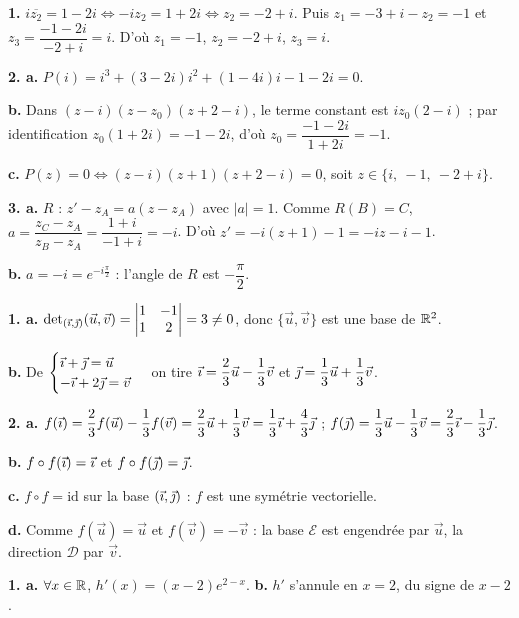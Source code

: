 \documentclass[11pt]{article}
\begin{document}

\textbf{1.} $i\overline{z_2} = 1 - 2i \Leftrightarrow -i z_2 = 1 + 2i \Leftrightarrow z_2 = -2 + i$. Puis $z_1 = -3 + i - z_2 = -1$ et $z_3 = \dfrac{-1 - 2i}{-2 + i} = i$. D'où $z_1 = -1$, $z_2 = -2 + i$, $z_3 = i$.

\textbf{2. a.} $P(i) = i^3 + (3 - 2i)i^2 + (1 - 4i)i - 1 - 2i = 0$.

\textbf{b.} Dans $(z - i)(z - z_0)(z + 2 - i)$, le terme constant est $i z_0(2 - i)$ ; par identification $z_0(1 + 2i) = -1 - 2i$, d'où $z_0 = \dfrac{-1 - 2i}{1 + 2i} = -1$.

\textbf{c.} $P(z) = 0 \Leftrightarrow (z - i)(z + 1)(z + 2 - i) = 0$, soit $z \in \{i,\ -1,\ -2 + i\}$.

\textbf{3. a.} $R$ : $z' - z_A = a(z - z_A)$ avec $|a| = 1$. Comme $R(B) = C$, $a = \dfrac{z_C - z_A}{z_B - z_A} = \dfrac{1 + i}{-1 + i} = -i$. D'où $z' = -i(z + 1) - 1 = -iz - i - 1$.

\textbf{b.} $a = -i = e^{-i\frac{\pi}{2}}$ : l'angle de $R$ est $-\dfrac{\pi}{2}$.

\textbf{1. a.} $\det_{(\vec{\imath},\vec{\jmath})}(\vec{u}, \vec{v}) = \begin{vmatrix} 1 & -1 \\ 1 & 2 \end{vmatrix} = 3 \ne 0$, donc $\{\vec{u}, \vec{v}\}$ est une base de $\mathbb{R}^2$.

\textbf{b.} De $\begin{cases} \vec{\imath} + \vec{\jmath} = \vec{u} \\ -\vec{\imath} + 2\vec{\jmath} = \vec{v} \end{cases}$ on tire $\vec{\imath} = \dfrac{2}{3}\vec{u} - \dfrac{1}{3}\vec{v}$ et $\vec{\jmath} = \dfrac{1}{3}\vec{u} + \dfrac{1}{3}\vec{v}$.

\textbf{2. a.} $f(\vec{\imath}) = \dfrac{2}{3}f(\vec{u}) - \dfrac{1}{3}f(\vec{v}) = \dfrac{2}{3}\vec{u} + \dfrac{1}{3}\vec{v} = \dfrac{1}{3}\vec{\imath} + \dfrac{4}{3}\vec{\jmath}$ ; $f(\vec{\jmath}) = \dfrac{1}{3}\vec{u} - \dfrac{1}{3}\vec{v} = \dfrac{2}{3}\vec{\imath} - \dfrac{1}{3}\vec{\jmath}$.

\textbf{b.} $f\circ f(\vec{\imath}) = \vec{\imath}$ et $f\circ f(\vec{\jmath}) = \vec{\jmath}$.

\textbf{c.} $f\circ f = \mathrm{id}$ sur la base $(\vec{\imath},\vec{\jmath})$ : $f$ est une symétrie vectorielle.

\textbf{d.} Comme $f(\vec{u}) = \vec{u}$ et $f(\vec{v}) = -\vec{v}$ : la base $\mathscr{E}$ est engendrée par $\vec{u}$, la direction $\mathscr{D}$ par $\vec{v}$.

\textbf{1. a.} $\forall x \in \mathbb{R}$, $h'(x) = (x - 2)e^{2-x}$. \textbf{b.} $h'$ s'annule en $x = 2$, du signe de $x - 2$.
\end{document}

